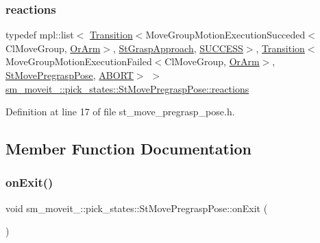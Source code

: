 \subsubsection{\texorpdfstring{reactions}{reactions}}
{\footnotesize\ttfamily typedef mpl\+::list$<$ \hyperlink{classsmacc_1_1Transition}{Transition}$<$Move\+Group\+Motion\+Execution\+Succeded$<$Cl\+Move\+Group, \hyperlink{classsm__moveit__4_1_1OrArm}{Or\+Arm}$>$, \hyperlink{structsm__moveit__4_1_1pick__states_1_1StGraspApproach}{St\+Grasp\+Approach}, \hyperlink{structsmacc_1_1default__transition__tags_1_1SUCCESS}{S\+U\+C\+C\+E\+SS}$>$, \hyperlink{classsmacc_1_1Transition}{Transition}$<$Move\+Group\+Motion\+Execution\+Failed$<$Cl\+Move\+Group, \hyperlink{classsm__moveit__4_1_1OrArm}{Or\+Arm}$>$, \hyperlink{structsm__moveit__4_1_1pick__states_1_1StMovePregraspPose}{St\+Move\+Pregrasp\+Pose}, \hyperlink{structsmacc_1_1default__transition__tags_1_1ABORT}{A\+B\+O\+RT}$>$ $>$ \hyperlink{structsm__moveit__4_1_1pick__states_1_1StMovePregraspPose_a4329bf7123b5978a7418bda57b17541d}{sm\+\_\+moveit\+\_\+::pick\+\_\+states\+::\+St\+Move\+Pregrasp\+Pose\+::reactions}}



Definition at line 17 of file st\+\_\+move\+\_\+pregrasp\+\_\+pose.\+h.



\subsection{Member Function Documentation}
\mbox{\label{structsm__moveit__4_1_1pick__states_1_1StMovePregraspPose_ae2f50199e1766c1bcdb8fcd25e9a0e16}} 
\subsubsection{\texorpdfstring{on\+Exit()}{onExit()}}
{\footnotesize\ttfamily void sm\+\_\+moveit\+\_\+::pick\+\_\+states\+::\+St\+Move\+Pregrasp\+Pose\+::on\+Exit (\begin{DoxyParamCaption}{ }\end{DoxyParamCaption})\hspace{0.3cm}{\ttfamily [inline]}}



